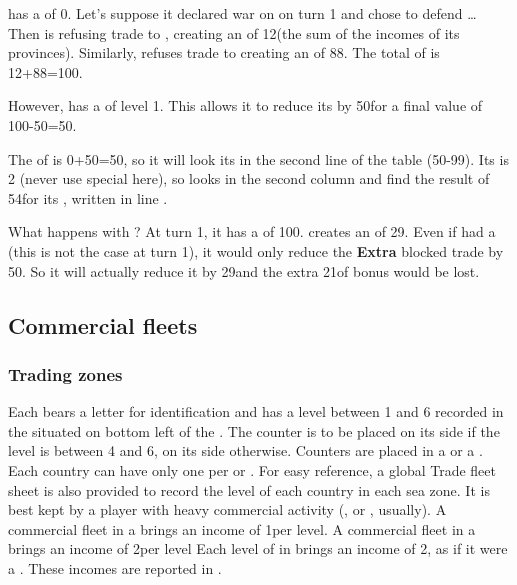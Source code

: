 \begin{exemple}
  \POR has a  of 0. Let's suppose it declared
  war on \paysMaroc on turn 1 and \TUR chose to defend \paysMaroc\ldots
  Then \paysMaroc is refusing trade to \POR, creating an  of 12\ducats (the sum of the incomes of its
  provinces). Similarly, \TUR refuses trade to \POR creating an
   of 88\ducats. The total  of \POR is 12+88=100\ducats.

  However, \POR has a  \MNU of level 1. This allows it to
  reduce its  by 50\ducats for a final value
  of 100-50=50\ducats.

  The  of \POR is 0+50=50\ducats, so it will look
  its  in the second line of the table
  (50-99). Its \FTI is 2 (never use special \FTI here), so \POR looks in
  the second column and find the result of 54\ducats for its
  , written in line .

  What happens with \TUR? At turn 1, it has a  of 100\ducats. \POR creates an  of
  29\ducats. Even if \TUR had a  \MNU (this is not the case
  at turn 1), it would only reduce the \textbf{Extra} blocked trade by
  50\ducats. So it will actually reduce it by 29\ducats and the extra
  21\ducats of bonus would be lost.
\end{exemple}

\subsection{Commercial fleets}
\subsubsection{Trading zones}
\aparag Each \TradeFLEET bears a letter for identification and has a
level between 1 and 6 recorded in the 
situated on bottom left of the .
\bparag The counter is to be placed on its \Faceplus side if the level
is between 4 and 6, on its \Facemoins side otherwise.
\bparag Counters are placed in a \CTZ or a \STZ. Each country can have
only one \TradeFLEET per \CTZ or \STZ.
\bparag For easy reference, a global Trade fleet sheet is also provided
to record the level of each country in each sea zone. It is best kept by
a player with heavy commercial activity (\POR, \HOL or \ANG, usually).
\aparag A commercial fleet in a \STZ brings an income of 1\ducats per
level.
\bparag A commercial fleet in a \CTZ brings an income of 2\ducats per
level
 Each level of \TradeFLEET in 
brings an income of 2\ducats, as if it were a \CTZ.
\bparag These incomes are reported in .

